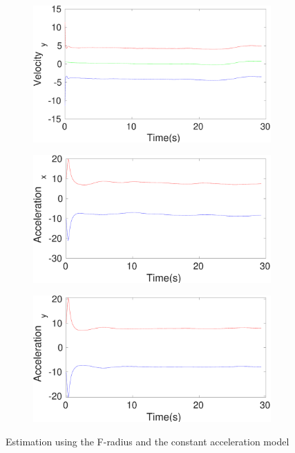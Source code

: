 \begin{figure}[h]
\begin{subfigure}{.5\linewidth}
\end{subfigure}
\begin{subfigure}{.5\linewidth}
\centering
\includegraphics[width=\linewidth]{figures/Frad/s3caSMVelocity_y}
\end{subfigure}
\begin{subfigure}{.5\linewidth}
\centering
\includegraphics[width=\linewidth]{figures/Frad/s3caSMAcceleration_x}
\end{subfigure}
\begin{subfigure}{.5\linewidth}
\centering
\includegraphics[width=\linewidth]{figures/Frad/s3caSMAcceleration_y}
\end{subfigure}
\caption{Estimation using the F-radius and the constant acceleration model}
\end{figure}

